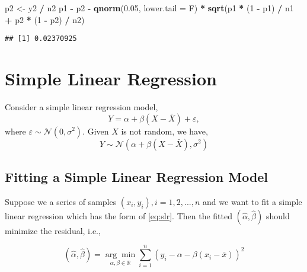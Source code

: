 \documentclass[
]{book}
\newenvironment{Shaded}{\begin{snugshade}}{\end{snugshade}}
\newcommand{\DataTypeTok}[1]{\textcolor[rgb]{0.13,0.29,0.53}{#1}}
\newcommand{\DecValTok}[1]{\textcolor[rgb]{0.00,0.00,0.81}{#1}}
\newcommand{\FloatTok}[1]{\textcolor[rgb]{0.00,0.00,0.81}{#1}}
\newcommand{\KeywordTok}[1]{\textcolor[rgb]{0.13,0.29,0.53}{\textbf{#1}}}
\newcommand{\NormalTok}[1]{#1}
\newcommand{\OperatorTok}[1]{\textcolor[rgb]{0.81,0.36,0.00}{\textbf{#1}}}
\newcommand{\StringTok}[1]{\textcolor[rgb]{0.31,0.60,0.02}{#1}}
\theoremstyle{definition}
\theoremstyle{definition}
\theoremstyle{definition}
\theoremstyle{remark}
\begin{document}
\begin{Shaded}
\begin{Highlighting}[]
\NormalTok{p2 <{-}}\StringTok{ }\NormalTok{y2 }\OperatorTok{/}\StringTok{ }\NormalTok{n2}
\NormalTok{p1 }\OperatorTok{{-}}\StringTok{ }\NormalTok{p2 }\OperatorTok{{-}}\StringTok{ }\KeywordTok{qnorm}\NormalTok{(}\FloatTok{0.05}\NormalTok{, }\DataTypeTok{lower.tail =}\NormalTok{ F) }\OperatorTok{*}\StringTok{ }\KeywordTok{sqrt}\NormalTok{(p1 }\OperatorTok{*}\StringTok{ }\NormalTok{(}\DecValTok{1} \OperatorTok{{-}}\StringTok{ }\NormalTok{p1) }\OperatorTok{/}\StringTok{ }\NormalTok{n1 }\OperatorTok{+}\StringTok{ }\NormalTok{p2 }\OperatorTok{*}\StringTok{ }\NormalTok{(}\DecValTok{1} \OperatorTok{{-}}\StringTok{  }\NormalTok{p2) }\OperatorTok{/}\StringTok{ }\NormalTok{n2)}
\end{Highlighting}
\end{Shaded}

\begin{verbatim}
## [1] 0.02370925
\end{verbatim}

\hypertarget{simple-linear-regression}{%
\chapter{Simple Linear Regression}\label{simple-linear-regression}}

Consider a simple linear regression model,
\begin{equation}
Y = \alpha + \beta(X-\bar X) + \varepsilon,
\label{eq:slr}
\end{equation}
where \(\varepsilon\sim \mathcal{N}(0, \sigma^2)\). Given \(X\) is not random, we have,
\begin{equation}
Y\sim \mathcal{N}(\alpha + \beta(X-\bar X), \sigma^2)
\end{equation}

\hypertarget{fitting-a-simple-linear-regression-model}{%
\section{Fitting a Simple Linear Regression Model}\label{fitting-a-simple-linear-regression-model}}

Suppose we a series of samples \((x_i,y_i), i=1,2,...,n\) and we want to fit a simple linear regression which has the form of \eqref{eq:slr}. Then the fitted \((\hat \alpha,\hat\beta)\) should minimize the residual, i.e.,

\begin{equation}
(\hat \alpha,\hat\beta) = \underset{\alpha,\beta\in \mathbb{R}}{\arg\min}\sum_{i=1}^n(y_i-\alpha-\beta(x_i-\bar x))^2
\label{eq:residual}
\end{equation}
\end{document}
